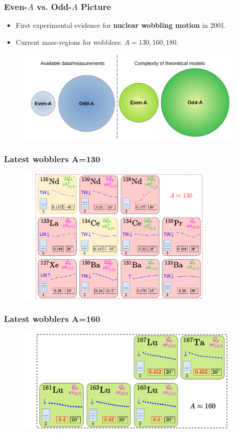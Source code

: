 \documentclass{beamer}
\begin{document}
\begin{frame}
	\frametitle{Even-$A$ vs. Odd-$A$ Picture}
	\begin{itemize}
		\item First experimental evidence for \textbf{nuclear wobbling motion} in 2001.
		\item Current mass-regions for wobblers: $A=130,160,180$.
	\end{itemize}
	\begin{figure}
		\centering
		\includegraphics[width=0.99\textwidth]{figures/even-vs-odda.pdf}
	\end{figure}
\end{frame}

\begin{frame}
	\frametitle{Latest wobblers A=130}
	\begin{figure}
		\centering
		\includegraphics[width=0.87\textwidth]{figures/wobblers-chart-2.pdf}
	\end{figure}
\end{frame}

\begin{frame}
	\frametitle{Latest wobblers A=160}
	\begin{figure}
		\centering
		\includegraphics[width=0.99\textwidth]{figures/wobblers-chart-4.pdf}
	\end{figure}
\end{frame}
\end{document}
